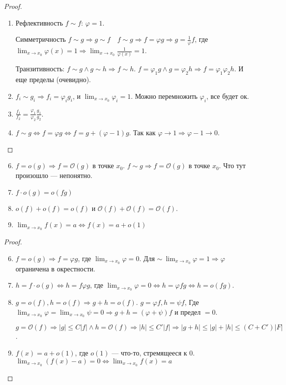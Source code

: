 \begin{proof}
    \begin{enumerate}
        \item Рефлективность $f \sim f$:  $\varphi = 1$.

            Симметричность $f \sim g \Rightarrow g \sim f \quad f \sim g \Rightarrow f = \varphi g \Rightarrow g = \frac{1}{\varphi} f$, где $\lim_{x \to x_0} \varphi(x) = 1 \Rightarrow \lim_{x \to x_0} \frac{1}{\varphi(x)} = 1$.

            Транзитивность: $f \sim g \land g \sim h \Rightarrow f \sim h$.  $f = \varphi_1 g \land g = \varphi_2 h \Rightarrow f = \varphi_1 \varphi_2 h$. И еще пределы (очевидно).
        \item $f_i \sim g_i \Rightarrow f_i = \varphi_i g_i$, и  $\lim_{x \to x_0}\varphi_i = 1$. Можно перемножить  $\varphi_i$, все будет ок.
        \item  $\frac{f_1}{f_2} = \frac{\varphi_1}{\varphi_2} \frac{g_1}{g_2}$.
        \item $f \sim g \iff f = \varphi g \iff f = g + (\varphi  - 1) g$. Так как  $\varphi \to 1 \Rightarrow \varphi - 1 \to 0$.
    \end{enumerate}
\end{proof}
\begin{properties}
   \begin{enumerate}
       \setcounter{enumi}{5}
   \item $f = o(g) \Rightarrow f = \mathcal{O}(g)$ в точке  $x_0$. $f \sim g \Rightarrow f = \mathcal{O}(g)$ в точке $x_0$. Что тут произошло --- непонятно.
   \item  $f \cdot o(g) = o(fg)$
   \item  $o(f) + o(f) = o(f)$ и  $\mathcal{O}(f) + \mathcal{O}(f) = \mathcal{O}(f)$.
   \item $\lim_{x\to x_0} f(x) = a \iff f(x) = a + o(1)$
   \end{enumerate} 
\end{properties}
\begin{proof}
    \begin{enumerate}
        \setcounter{enumi}{5}
    \item $f = o(g) \Rightarrow f = \varphi g$, где  $\lim_{x \to x_0} \varphi = 0.$
        Для $\sim\ \lim_{x \to x_0} \varphi = 1 \Rightarrow \varphi$ ограничена в окрестности.
    \item $h = f \cdot o(g) \iff h = f \varphi g$, где  $\lim_{x \to x_0} \varphi = 0 \iff h = \varphi f g \iff h = o(fg)$.
    \item  $g = o(f), h = o(f) \Rightarrow g + h = o(f)$.  $g = \varphi f, h = \psi f$, Где  $\lim_{x \to x_0} \varphi = \lim_{x \to x_0} \psi = 0 \Rightarrow g+h = (\varphi + \psi)f$ и предел $=0$.

        $g = \mathcal{O}(f) \Rightarrow |g| \le C|f| \land h = \mathcal{O}(f) \Rightarrow |h| \le C'|f| \Rightarrow |g+h| \le |g| + |h| \le (C + C') |F|$.
    \item $f(x) = a + o(1)$, где  $o(1)$ --- что-то, стремящееся к 0.  $\lim_{x \to x_0} (f(x) - a) = 0 \iff \lim_{x \to x_0} f(x) = a$
    \end{enumerate}
\end{proof}
